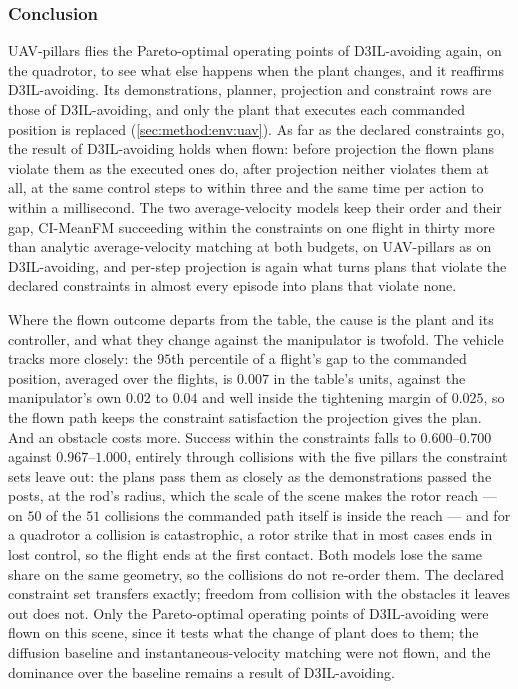 \FloatBarrier
\subsubsection{Conclusion}\label{sec:res:uav:pillars:conclusion}

UAV-pillars flies the Pareto-optimal operating points of D3IL-avoiding again, on the quadrotor, to see what
else happens when the plant changes, and it reaffirms D3IL-avoiding. Its demonstrations, planner, projection
and constraint rows are those of D3IL-avoiding, and only the plant that executes each commanded position is
replaced (\autoref{sec:method:env:uav}). As far as the declared constraints go, the result of D3IL-avoiding holds when
flown: before projection the flown plans violate them as the executed ones do, after projection neither
violates them at all, at the same control steps to within three and the same time per action to within a
millisecond. The two average-velocity models keep their order and their gap, CI-MeanFM succeeding within the
constraints on one flight in thirty more than analytic average-velocity matching at both budgets, on
UAV-pillars as on D3IL-avoiding, and per-step projection is again what turns plans that violate the declared
constraints in almost every episode into plans that violate none.

Where the flown outcome departs from the table, the cause is the plant and its controller, and what they
change against the manipulator is twofold. The vehicle tracks more
closely: the $95$th percentile of a flight's gap to the commanded position, averaged over the flights, is
$0.007$ in the table's units, against the
manipulator's own $0.02$ to $0.04$ and well inside the tightening margin of $0.025$, so the flown path keeps
the constraint satisfaction the projection gives the plan. And an obstacle costs more. Success within the
constraints falls to $0.600$--$0.700$ against $0.967$--$1.000$, entirely through collisions with the five
pillars the constraint sets leave out: the plans pass them as closely as the demonstrations passed the posts,
at the rod's radius, which the scale of the scene makes the rotor reach --- on $50$ of the $51$ collisions the
commanded path itself is inside the reach --- and for a quadrotor a collision is catastrophic, a rotor strike
that in most cases ends in lost control, so the flight ends at the first contact. Both models lose the same
share on the same geometry, so the collisions do not re-order them. The declared constraint set transfers
exactly; freedom from collision with the obstacles it leaves out does not.
Only the Pareto-optimal operating points of D3IL-avoiding were flown on this scene, since it tests what
the change of plant does to them; the diffusion baseline and instantaneous-velocity matching were not flown,
and the dominance over the baseline remains a result of D3IL-avoiding.

